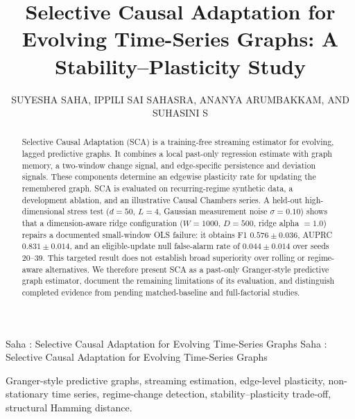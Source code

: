 \documentclass{ieeeaccess}
\begin{document}
\title{Selective Causal Adaptation for Evolving Time-Series Graphs: A Stability--Plasticity Study}
\author{\uppercase{Suyesha Saha},
\uppercase{Ippili Sai Sahasra},
\uppercase{Ananya Arumbakkam}, AND
\uppercase{Suhasini S}}

\address[1]{School of Computer Science and Engineering, Vellore Institute of Technology, Chennai, India (e-mail: suyesha.saha2024@vitstudent.ac.in, ippili.saisahasra2024@vitstudent.ac.in, ananya.arumbakkam2024@vitstudent.ac.in)}
\address[2]{School of Electronics Engineering, Vellore Institute of Technology, Chennai, India (e-mail: suhasini.s@vit.ac.in)}

\markboth
{Saha \headeretal: Selective Causal Adaptation for Evolving Time-Series Graphs}
{Saha \headeretal: Selective Causal Adaptation for Evolving Time-Series Graphs}


\begin{abstract}
Selective Causal Adaptation (SCA) is a training-free streaming estimator for evolving, lagged predictive graphs. It combines a local past-only regression estimate with graph memory, a two-window change signal, and edge-specific persistence and deviation signals. These components determine an edgewise plasticity rate for updating the remembered graph. SCA is evaluated on recurring-regime synthetic data, a development ablation, and an illustrative Causal Chambers series. A held-out high-dimensional stress test ($d=50$, $L=4$, Gaussian measurement noise $\sigma=0.10$) shows that a dimension-aware ridge configuration ($W=1000$, $D=500$, ridge alpha $=1.0$) repairs a documented small-window OLS failure: it obtains F1 $0.576\pm0.036$, AUPRC $0.831\pm0.014$, and an eligible-update null false-alarm rate of $0.044\pm0.014$ over seeds 20--39. This targeted result does not establish broad superiority over rolling or regime-aware alternatives. We therefore present SCA as a past-only Granger-style predictive graph estimator, document the remaining limitations of its evaluation, and distinguish completed evidence from pending matched-baseline and full-factorial studies.
\end{abstract}

\begin{keywords}
Granger-style predictive graphs, streaming estimation, edge-level plasticity, non-stationary time series, regime-change detection, stability--plasticity trade-off, structural Hamming distance.
\end{keywords}
\end{document}
